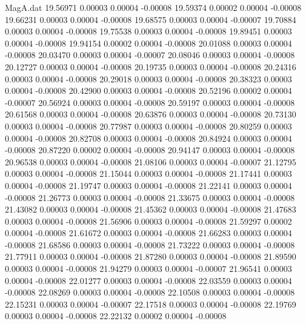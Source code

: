 \begin{filecontents}{MagA.dat}
  19.56971    0.00003    0.00004   -0.00008
  19.59374    0.00002    0.00004   -0.00008
  19.66231    0.00003    0.00004   -0.00008
  19.68575    0.00003    0.00004   -0.00007
  19.70884    0.00003    0.00004   -0.00008
  19.75538    0.00003    0.00004   -0.00008
  19.89451    0.00003    0.00004   -0.00008
  19.94154    0.00002    0.00004   -0.00008
  20.01088    0.00003    0.00004   -0.00008
  20.03470    0.00003    0.00004   -0.00007
  20.08046    0.00003    0.00004   -0.00008
  20.12727    0.00003    0.00004   -0.00008
  20.19735    0.00003    0.00004   -0.00008
  20.24316    0.00003    0.00004   -0.00008
  20.29018    0.00003    0.00004   -0.00008
  20.38323    0.00003    0.00004   -0.00008
  20.42900    0.00003    0.00004   -0.00008
  20.52196    0.00002    0.00004   -0.00007
  20.56924    0.00003    0.00004   -0.00008
  20.59197    0.00003    0.00004   -0.00008
  20.61568    0.00003    0.00004   -0.00008
  20.63876    0.00003    0.00004   -0.00008
  20.73130    0.00003    0.00004   -0.00008
  20.77987    0.00003    0.00004   -0.00008
  20.80259    0.00003    0.00004   -0.00008
  20.82708    0.00003    0.00004   -0.00008
  20.84924    0.00003    0.00004   -0.00008
  20.87220    0.00002    0.00004   -0.00008
  20.94147    0.00003    0.00004   -0.00008
  20.96538    0.00003    0.00004   -0.00008
  21.08106    0.00003    0.00004   -0.00007
  21.12795    0.00003    0.00004   -0.00008
  21.15044    0.00003    0.00004   -0.00008
  21.17441    0.00003    0.00004   -0.00008
  21.19747    0.00003    0.00004   -0.00008
  21.22141    0.00003    0.00004   -0.00008
  21.26773    0.00003    0.00004   -0.00008
  21.33675    0.00003    0.00004   -0.00008
  21.43082    0.00003    0.00004   -0.00008
  21.45362    0.00003    0.00004   -0.00008
  21.47683    0.00003    0.00004   -0.00008
  21.56906    0.00003    0.00004   -0.00008
  21.59297    0.00002    0.00004   -0.00008
  21.61672    0.00003    0.00004   -0.00008
  21.66283    0.00003    0.00004   -0.00008
  21.68586    0.00003    0.00004   -0.00008
  21.73222    0.00003    0.00004   -0.00008
  21.77911    0.00003    0.00004   -0.00008
  21.87280    0.00003    0.00004   -0.00008
  21.89590    0.00003    0.00004   -0.00008
  21.94279    0.00003    0.00004   -0.00007
  21.96541    0.00003    0.00004   -0.00008
  22.01277    0.00003    0.00004   -0.00008
  22.03559    0.00003    0.00004   -0.00008
  22.08269    0.00003    0.00004   -0.00008
  22.10508    0.00003    0.00004   -0.00008
  22.15231    0.00003    0.00004   -0.00007
  22.17518    0.00003    0.00004   -0.00008
  22.19769    0.00003    0.00004   -0.00008
  22.22132    0.00002    0.00004   -0.00008

\end{filecontents}
